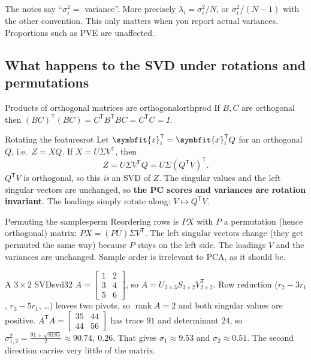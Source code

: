 \documentclass[11pt]{article}
\newcommand{\bm}[1]{\symbfit{#1}}
\newcommand{\vx}{\bm{x}}
\newcommand{\vz}{\bm{z}}
\newcommand{\T}{^{\mathsf T}}
\newcommand{\rank}{\operatorname{rank}}
\begin{document}
\begin{careful}
The notes say ``$\sigma_i^2=$ variance''. More precisely $\lambda_i=\sigma_i^2/N$, or $\sigma_i^2/(N-1)$
with the other convention. This only matters when you report actual variances.
Proportions such as PVE are unaffected.
\end{careful}

\subsection{What happens to the SVD under rotations and permutations}

\begin{proposition}{Products of orthogonal matrices are orthogonal}{orthprod}
If $B,C$ are orthogonal then $(BC)\T(BC)=C\T B\T BC=C\T C=I$.
\end{proposition}

\begin{example}{Rotating the features}{rot}
Let $\vz_i\T=\vx_i\T Q$ for an orthogonal $Q$, i.e.\ $Z=XQ$. If $X=U\Sigma V\T$, then
\[
Z=U\Sigma V\T Q=U\Sigma(Q\T V)\T .
\]
$Q\T V$ is orthogonal, so this \emph{is} an SVD of $Z$. The singular values and the left
singular vectors are unchanged, so \textbf{the PC scores and variances are rotation invariant}.
The loadings simply rotate along: $V\mapsto Q\T V$.
\end{example}

\begin{example}{Permuting the samples}{perm}
Reordering rows is $PX$ with $P$ a permutation (hence orthogonal) matrix:
$PX=(PU)\Sigma V\T$. The left singular vectors change (they get permuted the same way)
because $P$ stays on the left side. The loadings $V$ and the variances are unchanged.
Sample order is irrelevant to PCA, as it should be.
\end{example}

\begin{example}{A $3\times2$ SVD}{svd32}
$A=\begin{bmatrix}1&2\\3&4\\5&6\end{bmatrix}$, so $A=U_{3\times3}S_{3\times2}V\T_{2\times2}$. Row reduction
($r_2-3r_1$, $r_3-5r_1$, \dots) leaves two pivots, so $\rank A=2$ and both singular values are positive.
$A\T A=\begin{bmatrix}35&44\\44&56\end{bmatrix}$ has trace $91$ and determinant $24$, so
$\sigma_{1,2}^2=\tfrac{91\pm\sqrt{8185}}{2}\approx 90.74,\ 0.26$. That gives
$\sigma_1\approx9.53$ and $\sigma_2\approx0.51$. The second direction carries very little of the matrix.
\end{example}
\end{document}
